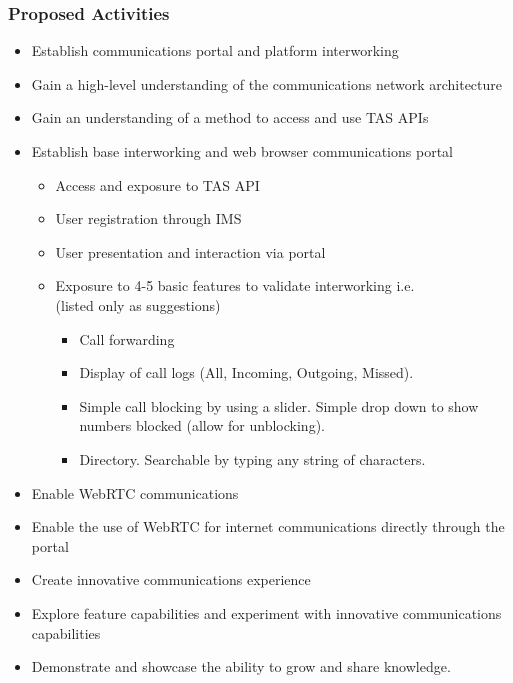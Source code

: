 \documentclass[12pt]{article}
\begin{document}
\pagebreak
\begin{spacing}{1.5} %
	\subsubsection{Proposed Activities}
	\begin{itemize}
		\item
		Establish communications portal and platform interworking
		\item
		Gain a high-level understanding of the communications network architecture
		\item
		Gain an understanding of a method to access and use TAS APIs
		\item
		Establish base interworking and web browser communications portal
	\begin{itemize}
		\item
		Access and exposure to TAS API
		\item
		User registration through IMS
		\item
		User presentation and interaction via portal
		\item
		Exposure to 4-5 basic features to validate interworking i.e. \\ 
		(listed only as suggestions)
	\begin{itemize}
		\item
		Call forwarding
		\item
		Display of call logs (All, Incoming, Outgoing, Missed).
		\item
		Simple call blocking by using a slider.  Simple drop down to show numbers blocked (allow
		for unblocking).
		\item
		Directory.  Searchable by typing any string of characters.
		\end{itemize}
		\end{itemize}
		\item
		Enable WebRTC communications
		\item
		Enable the use of WebRTC for internet communications directly through the portal
		
		\item
		Create innovative communications experience
		\item
		Explore feature capabilities and experiment with innovative communications capabilities
		\item
		Demonstrate and showcase the ability to grow and share knowledge.	
	\end{itemize}




\end{spacing}
\end{document}
